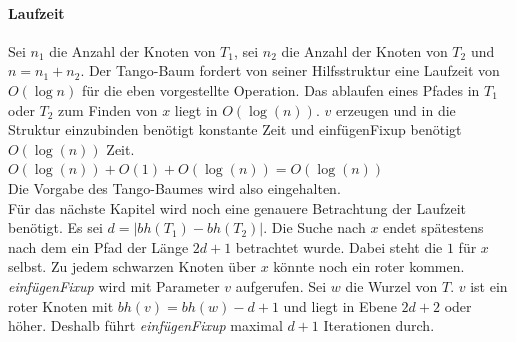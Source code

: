 \documentclass[a4paper,12pt]{article}
\begin{document}
\paragraph{Laufzeit}
Sei $n_1$ die Anzahl der Knoten von $T_1$, sei $n_2$ die Anzahl der Knoten von $T_2$ und $n = n_1 + n_2$. Der Tango-Baum fordert von seiner Hilfsstruktur eine Laufzeit von $O(\log n)$ für die eben vorgestellte Operation.  Das ablaufen eines Pfades in $T_1$ oder $T_2$ zum Finden von $x$ liegt in $O(\log (n))$. $v$ erzeugen und in die Struktur einzubinden benötigt konstante Zeit und einfügenFixup benötigt  $O(\log (n))$ Zeit.\\
$O(\log (n)) + O(1) +O(\log (n)) = O(\log (n))$\\
Die Vorgabe des Tango-Baumes wird also eingehalten.\\
Für das nächste Kapitel wird noch eine genauere Betrachtung der Laufzeit benötigt. Es sei $d = \vert \mathit{bh}(T_1) - \mathit{bh}(T_2)  \vert $. Die Suche nach $x$ endet spätestens nach dem ein Pfad der Länge $2d + 1$ betrachtet wurde. Dabei steht die $1$ für $x$ selbst. Zu jedem schwarzen Knoten über $x$ könnte noch ein roter kommen.\\
\textit{einfügenFixup} wird mit Parameter $v$ aufgerufen. Sei $w$ die Wurzel von $T$. $v$ ist ein roter Knoten mit $\mathit{bh}(v) = \mathit{bh}(w) - d + 1$ und liegt in Ebene $2d + 2$ oder höher. Deshalb führt \textit{einfügenFixup} maximal $d + 1$ Iterationen durch.  
\end{document}
